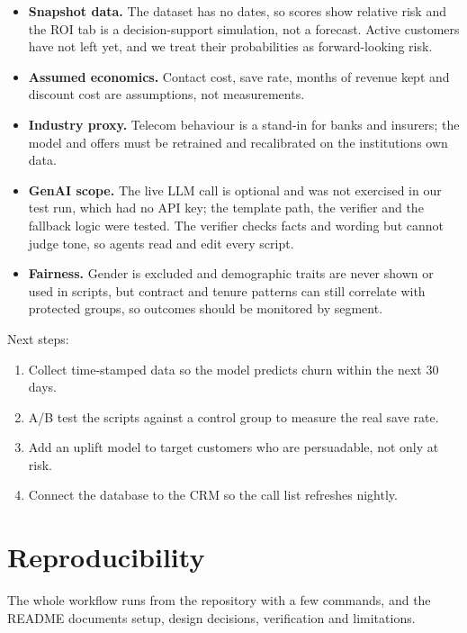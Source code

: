 \documentclass[11pt,a4paper]{article}
\begin{document}
\begin{itemize}
\item
  \textbf{Snapshot data.} The dataset has no dates, so scores show
  relative risk and the ROI tab is a decision-support simulation, not a
  forecast. Active customers have not left yet, and we treat their
  probabilities as forward-looking risk.
\item
  \textbf{Assumed economics.} Contact cost, save rate, months of revenue
  kept and discount cost are assumptions, not measurements.
\item
  \textbf{Industry proxy.} Telecom behaviour is a stand-in for banks and
  insurers; the model and offers must be retrained and recalibrated on
  the institution\textquotesingle s own data.
\item
  \textbf{GenAI scope.} The live LLM call is optional and was not
  exercised in our test run, which had no API key; the template path,
  the verifier and the fallback logic were tested. The verifier checks
  facts and wording but cannot judge tone, so agents read and edit every
  script.
\item
  \textbf{Fairness.} Gender is excluded and demographic traits are never
  shown or used in scripts, but contract and tenure patterns can still
  correlate with protected groups, so outcomes should be monitored by
  segment.
\end{itemize}

Next steps:

\begin{enumerate}
\def\labelenumi{\arabic{enumi}.}
\item
  Collect time-stamped data so the model predicts churn within the next
  30 days.
\item
  A/B test the scripts against a control group to measure the real save
  rate.
\item
  Add an uplift model to target customers who are persuadable, not only
  at risk.
\item
  Connect the database to the CRM so the call list refreshes nightly.
\end{enumerate}

\section{Reproducibility}

The whole workflow runs from the repository with a few commands, and the
README documents setup, design decisions, verification and limitations.
\end{document}
